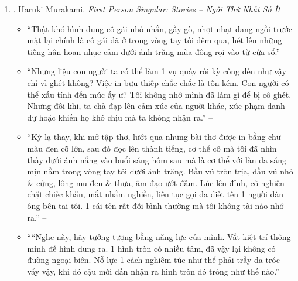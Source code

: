 \documentclass{article}
\begin{document}
\begin{enumerate}
\begin{itemize}
		\item ``The versatile \& prolific {\sc Murakami} collects 8 1st-person stories that affirm his obsessions -- American pop music \& magical realism, baseball \& sex -- yet break new literary ground. From a messy hookup to an imaginary {\sc Charlie Parker} album to a monkey masseur, the Japanese maestro taps the weirdness of the everyday, exposing conflicts that simmer within us all.'' -- {\sc Oprah Daily}
	\end{itemize}
	{\sf About the Author.} {\sc Haruki Murakami} was born in Kyoto in 1949 \& now lives near Tokyo. His work has been translated into $> 50$ languages, \& the most recent of his many international honors is the Hans Christian Andersen Literature Award, whose previous recipients include Karl Ove Knausgård, Isabel Allende, \& Salman Rushdie.
	
	\item \cite{Murakami_ngoi_1}. {\sc Haruki Murakami}. {\it First Person Singular: Stories -- Ngôi Thứ Nhất Số Ít}\hfill{\sf[done]}
	\begin{itemize}
		\item ``Thật khó hình dung cô gái nhỏ nhắn, gầy gò, nhợt nhạt đang ngồi trước mặt lại chính là cô gái đã ở trong vòng tay tôi đêm qua, hét lên những tiếng hân hoan nhục cảm dưới ánh trăng mùa đông rọi vào từ cửa sổ.'' -- \cite[Trên Gối Đá, p. 14]{Murakami_ngoi_1}
		\item ``Nhưng liệu con người ta có thể làm 1 vụ quấy rối kỳ công đến như vậy chỉ vì ghét không? Việc in bưu thiếp chắc chắc là tốn kém. Con người có thể xấu tính đến mức ấy ư? Tôi không nhớ mình đã làm gì để bị cô ghét. Nhưng đôi khi, ta chà đạp lên cảm xúc của người khác, xúc phạm danh dự hoặc khiến họ khó chịu mà ta không nhận ra.'' -- \cite[Kem, pp. 34--35]{Murakami_ngoi_1}
		\item ``Kỳ lạ thay, khi mở tập thơ, lướt qua những bài thơ được in bằng chữ màu đen cỡ lớn, sau đó đọc lên thành tiếng, cơ thể cô mà tôi đã nhìn thấy dưới ánh nắng vào buổi sáng hôm sau mà là cơ thể với làn da sáng mịn nằm trong vòng tay tôi dưới ánh trăng. Bầu vú tròn trịa, đầu vú nhỏ \& cứng, lông mu đen \& thưa, âm đạo ướt đẫm. Lúc lên đỉnh, cô nghiến chặt chiếc khăn, mắt nhắm nghiền, liên tục gọi da diết tên 1 người đàn ông bên tai tôi. 1 cái tên rất đỗi bình thường mà tôi không tài nào nhớ ra.'' -- \cite[Trên Gối Đá, p. 19]{Murakami_ngoi_1}
		\item ````Nghe này, hãy tưởng tượng bằng năng lực của mình. Vắt kiệt trí thông minh để hình dung ra. 1 hình tròn có nhiều tâm, đã vậy lại không có đường ngoại biên. Nỗ lực 1 cách nghiêm túc như thể phải trầy da tróc vẩy vậy, khi đó cậu mới dần nhận ra hình tròn đó trông như thế nào.''
		

\end{itemize}
\end{enumerate}
\end{document}
